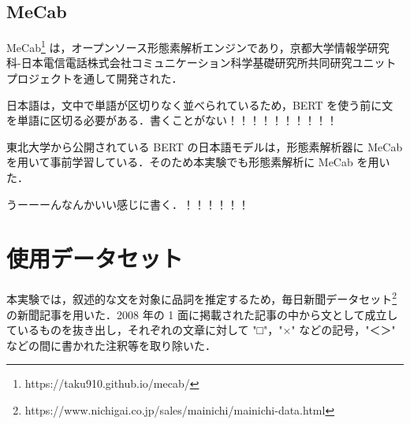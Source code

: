 \documentclass[twocolumn]{jarticle}
\begin{document}



  \subsection{MeCab}
  MeCab\footnote{https://taku910.github.io/mecab/} は，オープンソース形態素解析エンジンであり，京都大学情報学研究科-日本電信電話株式会社コミュニケーション科学基礎研究所共同研究ユニットプロジェクトを通して開発された．
  \par
  日本語は，文中で単語が区切りなく並べられているため，BERT を使う前に文を単語に区切る必要がある．書くことがない！！！！！！！！！！
  
  東北大学から公開されている BERT の日本語モデルは，形態素解析器に MeCab を用いて事前学習している．そのため本実験でも形態素解析に MeCab を用いた．

  \par
  うーーーんなんかいい感じに書く．！！！！！！



\section{使用データセット}
本実験では，叙述的な文を対象に品詞を推定するため，毎日新聞データセット\footnote{https://www.nichigai.co.jp/sales/mainichi/mainichi-data.html}の新聞記事を用いた．2008 年の 1 面に掲載された記事の中から文として成立しているものを抜き出し，それぞれの文章に対して "□"，"×" などの記号，"＜＞" などの間に書かれた注釈等を取り除いた． 
　



\end{document}
